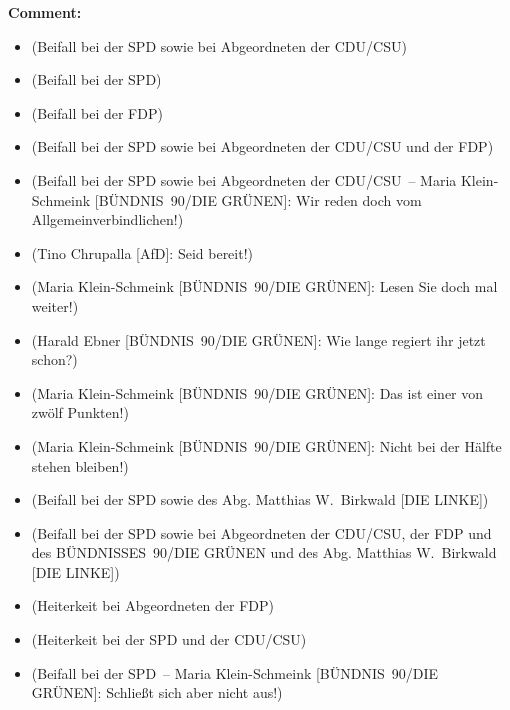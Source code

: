\documentclass{article}
\begin{document}
\noindent\textbf{Comment:}
\begin{itemize}
    \setlength\itemsep{-3pt}
    \item (Beifall bei der SPD sowie bei Abgeordneten der CDU/CSU)
    \setlength\itemsep{-3pt}
    \item (Beifall bei der SPD)
    \setlength\itemsep{-3pt}
    \item (Beifall bei der FDP)
    \setlength\itemsep{-3pt}
    \item (Beifall bei der SPD sowie bei Abgeordneten der CDU/CSU und der FDP)
    \setlength\itemsep{-3pt}
    \item (Beifall bei der SPD sowie bei Abgeordneten der CDU/CSU – Maria Klein-Schmeink [BÜNDNIS 90/DIE GRÜNEN]: Wir reden doch vom Allgemeinverbindlichen!)
    \setlength\itemsep{-3pt}
    \item (Tino Chrupalla [AfD]: Seid bereit!)
    \setlength\itemsep{-3pt}
    \item (Maria Klein-Schmeink [BÜNDNIS 90/DIE GRÜNEN]: Lesen Sie doch mal weiter!)
    \setlength\itemsep{-3pt}
    \item (Harald Ebner [BÜNDNIS 90/DIE GRÜNEN]: Wie lange regiert ihr jetzt schon?)
    \setlength\itemsep{-3pt}
    \item (Maria Klein-Schmeink [BÜNDNIS 90/DIE GRÜNEN]: Das ist einer von zwölf Punkten!)
    \setlength\itemsep{-3pt}
    \item (Maria Klein-Schmeink [BÜNDNIS 90/DIE GRÜNEN]: Nicht bei der Hälfte stehen bleiben!)
    \setlength\itemsep{-3pt}
    \item (Beifall bei der SPD sowie des Abg. Matthias W. Birkwald [DIE LINKE])
    \setlength\itemsep{-3pt}
    \item (Beifall bei der SPD sowie bei Abgeordneten der CDU/CSU, der FDP und des BÜNDNISSES 90/DIE GRÜNEN und des Abg. Matthias W. Birkwald [DIE LINKE])
    \setlength\itemsep{-3pt}
    \item (Heiterkeit bei Abgeordneten der FDP)
    \setlength\itemsep{-3pt}
    \item (Heiterkeit bei der SPD und der CDU/CSU)
    \setlength\itemsep{-3pt}
    \item (Beifall bei der SPD – Maria Klein-Schmeink [BÜNDNIS 90/DIE GRÜNEN]: Schließt sich aber nicht aus!)
\end{itemize}
\end{document}
